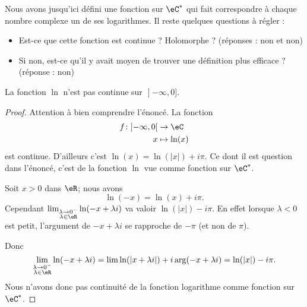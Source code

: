 Nous avons jusqu'ici défini une fonction sur \( \eC^*\) qui fait correspondre à chaque nombre complexe un de ses logarithmes. Il reste quelques questions à régler :
\begin{itemize}
	\item Est-ce que cette fonction est continue ? Holomorphe ? (réponses : non et non)
	\item Si non, est-ce qu'il y avait moyen de trouver une définition plus efficace ? (réponse : non)
\end{itemize}

\begin{lemma}       \label{LEMooMUOIooCnoWwq}
	La fonction \( \ln\) n'est pas continue sur \( \mathopen] -\infty , 0 \mathclose]\).
\end{lemma}

\begin{proof}
	Attention à bien comprendre l'énoncé. La fonction
	\begin{equation}
		\begin{aligned}
			f\colon \mathopen] -\infty , 0 \mathclose[ & \to \eC        \\
			x                                          & \mapsto \ln(x)
		\end{aligned}
	\end{equation}
	est continue. D'ailleurs c'est \( \ln(x)=\ln(| x |)+i\pi\). Ce dont il est question dans l'énoncé, c'est de la fonction \( \ln\) vue comme fonction sur \( \eC^*\).

	Soit \( x>0\) dans \( \eR\); nous avons
	\begin{equation}
		\ln(-x)=\ln(x)+i\pi.
	\end{equation}
	Cependant \( \lim_{\substack{\lambda\to 0^-\\\lambda\in \eR}}\ln(-x+\lambda i) \) va valoir \( \ln(| x |)-i\pi\). En effet lorsque \( \lambda<0\) est petit, l'argument de \( -x+\lambda i\) se rapproche de \( -\pi\) (et non de \( \pi\)).

	\begin{center}
		
	\end{center}

	Donc
	\begin{equation}
		\lim_{\substack{\lambda\to 0^-\\\lambda\in \eR}}\ln(-x+\lambda i)=\lim \ln(| x+\lambda i |)+i\arg(-x+\lambda i)=\ln(| x |)-i\pi.
	\end{equation}
	Nous n'avons donc pas continuité de la fonction logarithme comme fonction sur \( \eC^*\).
\end{proof}

